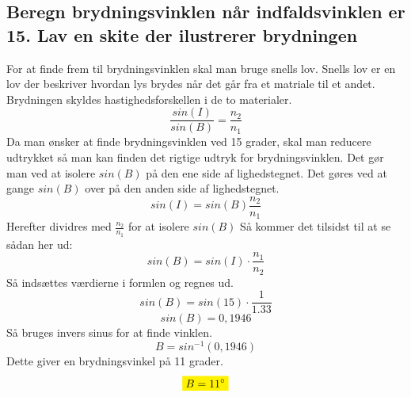 \subsection{Beregn brydningsvinklen når indfaldsvinklen er 15. Lav en skite der ilustrerer brydningen}
For at finde frem til brydningsvinklen skal man bruge snells lov. Snells lov er en lov der beskriver hvordan lys brydes når det går fra et matriale til et andet. Brydningen skyldes hastighedsforskellen i de to materialer.
\begin{equation*}
    \frac{sin(I)}{sin(B)}=\frac{n_2}{n_1}
\end{equation*}
Da man ønsker at finde brydningsvinklen ved 15 grader, skal man reducere udtrykket så man kan finden det rigtige udtryk for brydningsvinklen. Det gør man ved at isolere \begin{math}sin(B)\end{math} på den ene side af lighedstegnet. Det gøres ved at gange \begin{math}sin(B)\end{math} over på den anden side af lighedstegnet. 
\begin{equation*}
    sin(I)=sin(B)\frac{n_2}{n_1}
\end{equation*}
Herefter dividres med \begin{math}\frac{n_2}{n_1}\end{math} for at isolere \begin{math}sin(B)\end{math}
Så kommer det tilsidst til at se sådan her ud:
\begin{equation*}
    sin(B)=sin(I)\cdot\frac{n_1}{n_2}
\end{equation*}
Så indsættes værdierne i formlen og regnes ud. 
\begin{equation*}
    sin(B)=sin(15)\cdot\frac{1}{1.33}
\end{equation*}
\begin{equation*}
    sin(B)=0,1946
\end{equation*}
Så bruges invers sinus for at finde vinklen.
\begin{equation*}
    B=sin^{-1}(0,1946)
\end{equation*}
Dette giver en brydningsvinkel på 11 grader.
\begin{equation*}
    \mathcolorbox{yellow}{B=11^{\circ}}
\end{equation*}
